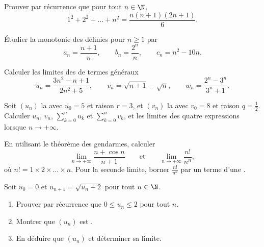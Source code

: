 \begin{exercise}[$\star$]\label{exo:g12:seq:1}
Prouver par récurrence que pour tout $n \in \N$,
\[
1^2 + 2^2 + \dots + n^2 = \frac{n(n+1)(2n+1)}{6}.
\]
\end{exercise}

\begin{exercise}[$\star$]\label{exo:g12:seq:2}
Étudier la monotonie des  définies pour $n \geq 1$ par
\[
a_n = \frac{n+1}{n}, \qquad
b_n = \frac{2^n}{n}, \qquad
c_n = n^2 - 10n .
\]
\end{exercise}

\begin{exercise}[$\star$]\label{exo:g12:seq:3}
Calculer les limites des  de termes généraux
\[
u_n = \frac{3n^2 - n + 1}{2n^2 + 5}, \qquad
v_n = \sqrt{n+1} - \sqrt{n}, \qquad
w_n = \frac{2^n - 3^n}{3^n + 1}.
\]
\end{exercise}

\begin{exercise}[$\star$]\label{exo:g12:seq:4}
Soit $(u_n)$ la  avec $u_0 = 5$ et raison $r = 3$, et
$(v_n)$ la  avec $v_0 = 8$ et raison $q = \frac{1}{2}$.
Calculer $u_n$, $v_n$, $\sum_{k=0}^{n} u_k$ et $\sum_{k=0}^{n} v_k$, et
les limites des quatre expressions lorsque $n \to +\infty$.
\end{exercise}

\begin{exercise}[$\star\star$]\label{exo:g12:seq:5}
En utilisant le théorème des gendarmes, calculer
\[
\lim_{n\to+\infty} \frac{n + \cos n}{n + 1}
\qquad\text{et}\qquad
\lim_{n\to+\infty} \frac{n!}{n^n},
\]
où $n! = 1 \times 2 \times \dots \times n$. Pour la seconde limite, borner
$\frac{n!}{n^n}$ par un terme d'une .
\end{exercise}

\begin{exercise}[$\star\star$]\label{exo:g12:seq:6}
Soit $u_0 = 0$ et $u_{n+1} = \sqrt{u_n + 2}$ pour tout $n \in \N$.
\begin{enumerate}
  \item Prouver par récurrence que $0 \leq u_n \leq 2$ pour tout $n$.
  \item Montrer que $(u_n)$ est .
  \item En déduire que $(u_n)$  et déterminer sa limite.
\end{enumerate}
\end{exercise}

